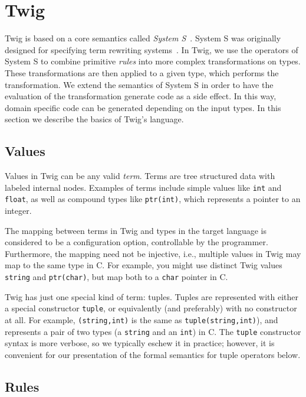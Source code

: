 
\section{Twig}
\label{sec:semantics}

Twig is based on a core semantics called \emph{System S}~\cite{system-s}. System
S was originally designed for specifying term rewriting
systems~\cite{baader98rewriting}. In Twig, we use the operators of System S to
combine primitive \emph{rules} into more complex transformations on types. These
transformations are then applied to a given type, which performs the
transformation. We extend the semantics of System S in order to have the
evaluation of the transformation generate code as a side effect. In this way,
domain specific code can be generated depending on the input types. In this
section we describe the basics of Twig's language.

\subsection{Values}

Values in Twig can be any valid \emph{term}. Terms are tree structured data with
labeled internal nodes. Examples of terms include simple values like
\texttt{int} and \texttt{float}, as well as compound types like
\texttt{ptr(int)}, which represents a pointer to an integer.

The mapping between terms in Twig and types in the target language is considered
to be a configuration option, controllable by the programmer. Furthermore, the
mapping need not be injective, i.e., multiple values in Twig may map to the same
type in C. For example, you might use distinct Twig values \texttt{string} and
\texttt{ptr(char)}, but map both to a \texttt{char} pointer in C.

Twig has just one special kind of term: tuples. Tuples are represented with
either a special constructor \texttt{tuple}, or equivalently (and preferably)
with no constructor at all. For example, \texttt{(string,int)} is the same as
\texttt{tuple(string,int)}), and represents a pair of two types (a
\texttt{string} and an \texttt{int}) in C. The \texttt{tuple} constructor syntax
is more verbose, so we typically eschew it in practice; however, it is
convenient for our presentation of the formal semantics for tuple operators
below.

\subsection{Rules}

